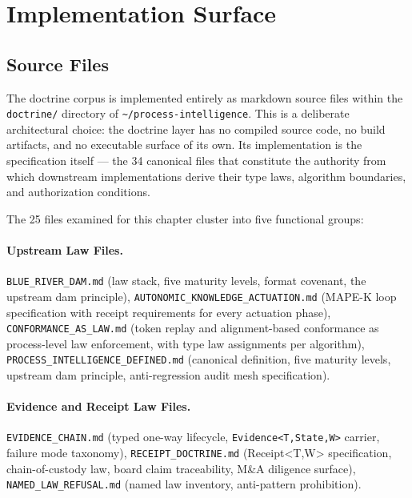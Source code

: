 \section{Implementation Surface}
\label{sec:doctrine-implementation}

\subsection{Source Files}
\label{sec:doctrine-implementation-sources}

The doctrine corpus is implemented entirely as markdown source files within the
\texttt{doctrine/} directory of \texttt{\textasciitilde/process-intelligence}. This is a
deliberate architectural choice: the doctrine layer has no compiled source code, no build
artifacts, and no executable surface of its own. Its implementation is the specification
itself --- the 34 canonical files that constitute the authority from which downstream
implementations derive their type laws, algorithm boundaries, and authorization conditions.

The 25 files examined for this chapter cluster into five functional groups:

\paragraph{Upstream Law Files.} \texttt{BLUE\_RIVER\_DAM.md} (law stack, five maturity
levels, format covenant, the upstream dam principle),
\texttt{AUTONOMIC\_KNOWLEDGE\_ACTUATION.md} (MAPE-K loop specification with receipt
requirements for every actuation phase), \texttt{CONFORMANCE\_AS\_LAW.md} (token replay and
alignment-based conformance as process-level law enforcement, with type law assignments per
algorithm), \texttt{PROCESS\_INTELLIGENCE\_DEFINED.md} (canonical definition, five maturity
levels, upstream dam principle, anti-regression audit mesh specification).

\paragraph{Evidence and Receipt Law Files.} \texttt{EVIDENCE\_CHAIN.md} (typed one-way
lifecycle, \texttt{Evidence\textless{}T,State,W\textgreater{}} carrier, failure mode
taxonomy), \texttt{RECEIPT\_DOCTRINE.md} (Receipt\textless{}T,W\textgreater{} specification,
chain-of-custody law, board claim traceability, M\&A diligence surface),
\texttt{NAMED\_LAW\_REFUSAL.md} (named law inventory, anti-pattern prohibition).

